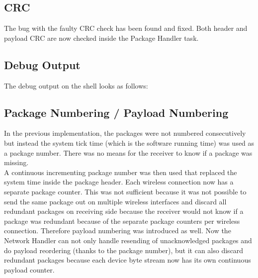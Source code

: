 \subsection{CRC}
The bug with the faulty CRC check has been found and fixed. Both header and payload CRC are now checked inside the Package Handler task.
%
\subsection{Debug Output}
The debug output on the shell looks as follows:\\
\noindent{}
%
%
\subsection{Package Numbering / Payload Numbering}
In the previous implementation, the packages were not numbered consecutively but instead the system tick time (which is the software running time) was used as a package number. There was no means for the receiver to know if a package was missing.\\
A continuous incrementing package number was then used that replaced the system time inside the package header. Each wireless connection now has a separate package counter. This was not sufficient because it was not possible to send the same package out on multiple wireless interfaces and discard all redundant packages on receiving side because the receiver would not know if a package was redundant because of the separate package counters per wireless connection. Therefore payload numbering was introduced as well. Now the Network Handler can not only handle resending of unacknowledged packages and do payload reordering (thanks to the package number), but it can also discard redundant packages because each device byte stream now has its own continuous payload counter.
%
%
